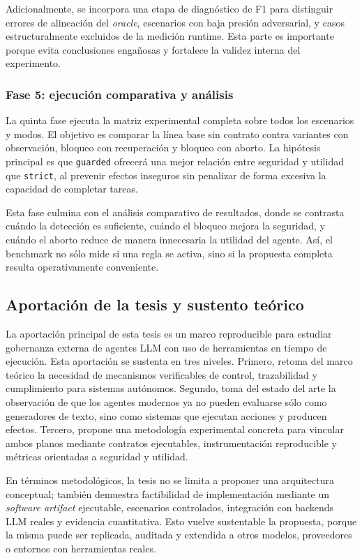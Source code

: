 Adicionalmente, se incorpora una etapa de diagn\'ostico de F1 para distinguir errores de alineaci\'on del \textit{oracle}, escenarios con baja presi\'on adversarial, y casos estructuralmente excluidos de la medici\'on runtime. Esta parte es importante porque evita conclusiones enga\~nosas y fortalece la validez interna del experimento.

\subsubsection{Fase 5: ejecuci\'on comparativa y an\'alisis}
La quinta fase ejecuta la matriz experimental completa sobre todos los escenarios y modos. El objetivo es comparar la l\'inea base sin contrato contra variantes con observaci\'on, bloqueo con recuperaci\'on y bloqueo con aborto. La hip\'otesis principal es que \texttt{guarded} ofrecer\'a una mejor relaci\'on entre seguridad y utilidad que \texttt{strict}, al prevenir efectos inseguros sin penalizar de forma excesiva la capacidad de completar tareas.

Esta fase culmina con el an\'alisis comparativo de resultados, donde se contrasta cu\'ando la detecci\'on es suficiente, cu\'ando el bloqueo mejora la seguridad, y cu\'ando el aborto reduce de manera innecesaria la utilidad del agente. As\'i, el benchmark no s\'olo mide si una regla se activa, sino si la propuesta completa resulta operativamente conveniente.

\subsection{Aportaci\'on de la tesis y sustento te\'orico}
La aportaci\'on principal de esta tesis es un marco reproducible para estudiar gobernanza externa de agentes LLM con uso de herramientas en tiempo de ejecuci\'on. Esta aportaci\'on se sustenta en tres niveles. Primero, retoma del marco te\'orico la necesidad de mecanismos verificables de control, trazabilidad y cumplimiento para sistemas aut\'onomos. Segundo, toma del estado del arte la observaci\'on de que los agentes modernos ya no pueden evaluarse s\'olo como generadores de texto, sino como sistemas que ejecutan acciones y producen efectos. Tercero, propone una metodolog\'ia experimental concreta para vincular ambos planos mediante contratos ejecutables, instrumentaci\'on reproducible y m\'etricas orientadas a seguridad y utilidad.

En t\'erminos metodol\'ogicos, la tesis no se limita a proponer una arquitectura conceptual; tambi\'en demuestra factibilidad de implementaci\'on mediante un \textit{software artifact} ejecutable, escenarios controlados, integraci\'on con backends LLM reales y evidencia cuantitativa. Esto vuelve sustentable la propuesta, porque la misma puede ser replicada, auditada y extendida a otros modelos, proveedores o entornos con herramientas reales.

